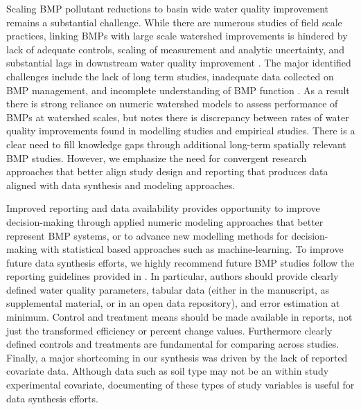\documentclass[utf8]{FrontiersinHarvard}
\begin{document}
Scaling BMP pollutant reductions to basin wide water quality improvement remains a substantial challenge.
While there are numerous studies of field scale practices, linking BMPs with large scale watershed improvements is hindered by lack of adequate controls, scaling of measurement and analytic uncertainty, and substantial lags in downstream water quality improvement \citep{tomerChallengeDocumentingWater2011, mellandEffectsAgriculturalLand2018, mealsLagTimeWater2010}.
The major identified challenges include the lack of long term studies, inadequate data collected on BMP management, and incomplete understanding of BMP function \citep{linternBestManagementPractices2020, liuReviewEffectivenessBest2017}.
As a result there is strong reliance on numeric watershed models to assess performance of BMPs at watershed scales, but \citet{liuReviewEffectivenessBest2017} notes there is discrepancy between rates of water quality improvements found in modelling studies and empirical studies.
There is a clear need to fill knowledge gaps through additional long-term spatially relevant BMP studies.
However, we emphasize the need for convergent research approaches that better align study design and reporting that produces data aligned with data synthesis and modeling approaches.

Improved reporting and data availability provides opportunity to improve decision-making through applied numeric modeling approaches that better represent BMP systems, or to advance new modelling methods for decision-making with statistical based approaches such as machine-learning.
To improve future data synthesis efforts, we highly recommend future BMP studies follow the reporting guidelines provided in \citet{eagleMetaAnalysisConstrained2017}. In particular, authors should provide clearly defined water quality parameters, tabular data (either in the manuscript, as supplemental material, or in an open data repository), and error estimation at minimum.
Control and treatment means should be made available in reports, not just the transformed efficiency or percent change values.
Furthermore clearly defined controls and treatments are fundamental for comparing across studies. Finally, a major shortcoming in our synthesis was driven by the lack of reported covariate data. Although data such as soil type may not be an within study experimental covariate, documenting of these types of study variables is useful for data synthesis efforts.
\end{document}
